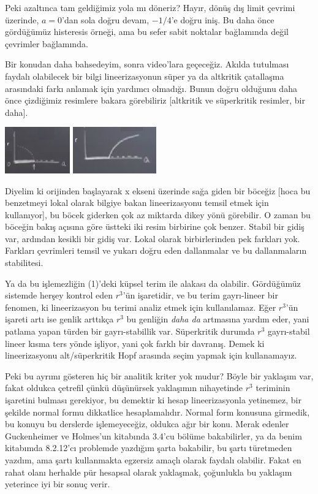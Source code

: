 \documentclass[12pt,fleqn]{article}\usepackage{../../common}
\begin{document}
Peki azaltınca tam geldiğimiz yola mı döneriz? Hayır, dönüş dış limit
çevrimi üzerinde, $a=0$'dan sola doğru devam, $-1/4$'e doğru iniş. Bu daha
önce gördüğümüz histeresis örneği, ama bu sefer sabit noktalar bağlamında
değil çevrimler bağlamında. 

Bir konudan daha bahsedeyim, sonra video'lara geçeceğiz. Akılda tutulması
faydalı olabilecek bir bilgi lineerizasyonun süper ya da altkritik
çatallaşma arasındaki farkı anlamak için yardımcı olmadığı. Bunun doğru
olduğunu daha önce çizdiğimiz resimlere bakara görebiliriz [altkritik ve
süperkritik resimler, bir daha]. 

\includegraphics[height=2cm]{13_04.png}
\includegraphics[height=2cm]{13_05.png}

Diyelim ki orijinden başlayarak x ekseni üzerinde sağa giden bir böceğiz
[hoca bu benzetmeyi lokal olarak bilgiye bakan lineerizasyonu temsil etmek
için kullanıyor], bu böcek giderken çok az miktarda dikey yönü görebilir. O
zaman bu böceğin bakış açısına göre üstteki iki resim birbirine çok
benzer. Stabil bir gidiş var, ardından kesikli bir gidiş var. Lokal olarak
birbirlerinden pek farkları yok. Farkları çevrimleri temsil ve yukarı
doğru eden dallanmalar ve bu dallanmaların stabilitesi.

Ya da bu işlemezliğin (1)'deki küpsel terim ile alakası da
olabilir. Gördüğümüz sistemde herşey kontrol eden $r^3$'ün işaretidir, ve
bu terim gayrı-lineer bir fenomen, ki lineerizasyon bu terimi analiz etmek
için kullanılamaz. Eğer $r^3$'ün işareti artı ise genlik arttıkça $r^3$ bu
genliğin {\em daha da} artmasına yardım eder, yani patlama yapan türden bir
gayrı-stabillik var. Süperkritik durumda $r^3$ gayrı-stabil lineer kısma
ters yönde işliyor, yani çok farklı bir davranış. Demek ki lineerizasyonu
alt/süperkritik Hopf arasında seçim yapmak için kullanamayız.

Peki bu ayrımı gösteren hiç bir analitik kriter yok mudur? Böyle bir
yaklaşım var, fakat oldukca çetrefil çünkü düşünürsek yaklaşımın
nihayetinde $r^3$ teriminin işaretini bulması gerekiyor, bu demektir ki
hesap lineerizasyonla yetinemez, bir şekilde normal formu dikkatlice
hesaplamalıdır. Normal form konusuna girmedik, bu konuyu bu derslerde
işlemeyeceğiz, oldukca ağır bir konu. Merak edenler Guckenheimer ve
Holmes'un kitabında 3.4'cu bölüme bakabilirler, ya da benim kitabımda
8.2.12'cı problemde yazdığım şarta bakabilir, bu şartı türetmeden yazdım,
ama şartı kullanmakta egzersiz amaçlı olarak faydalı olabilir. Fakat en
rahat olanı herhalde pür hesapsal olarak yaklaşmak, çoğunlukla bu yaklaşım
yeterince iyi bir sonuç verir.
\end{document}
